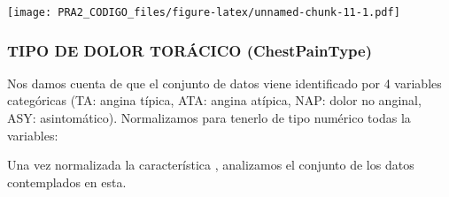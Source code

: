 \documentclass[
]{article}
\newenvironment{Shaded}{\begin{snugshade}}{\end{snugshade}}
\newcommand{\CommentTok}[1]{\textcolor[rgb]{0.50,0.62,0.50}{#1}}
\newcommand{\DecValTok}[1]{\textcolor[rgb]{0.86,0.86,0.80}{#1}}
\newcommand{\FunctionTok}[1]{\textcolor[rgb]{0.94,0.94,0.56}{#1}}
\newcommand{\NormalTok}[1]{\textcolor[rgb]{0.80,0.80,0.80}{#1}}
\newcommand{\OtherTok}[1]{\textcolor[rgb]{0.94,0.94,0.56}{#1}}
\newcommand{\SpecialCharTok}[1]{\textcolor[rgb]{0.86,0.64,0.64}{#1}}
\newcommand{\StringTok}[1]{\textcolor[rgb]{0.80,0.58,0.58}{#1}}
\begin{document}
\texttt{[image: PRA2\_CODIGO\_files/figure-latex/unnamed-chunk-11-1.pdf]}

\hypertarget{tipo-de-dolor-toruxe1cico-chestpaintype}{%
\subsubsection{TIPO DE DOLOR TORÁCICO
(ChestPainType)}\label{tipo-de-dolor-toruxe1cico-chestpaintype}}

Nos damos cuenta de que el conjunto de datos viene identificado por 4
variables categóricas (TA: angina típica, ATA: angina atípica, NAP:
dolor no anginal, ASY: asintomático). Normalizamos para tenerlo de tipo
numérico todas la variables:

\begin{Shaded}
\end{Shaded}

Una vez normalizada la característica , analizamos el conjunto de los
datos contemplados en esta.
\end{document}
